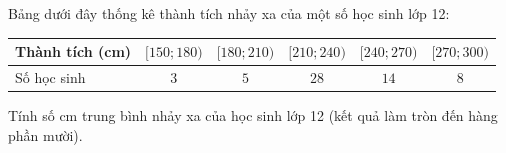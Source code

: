 \begin{ex}
Bảng dưới đây thống kê thành tích nhảy xa của một số học sinh lớp 12:
\begin{center}\begin{tabular}{|l|c|c|c|c|c|}\hline
Thành tích (cm) & $[150;180)$ & $[180;210)$ & $[210;240)$ & $[240;270)$ & $[270;300)$\\\hline
Số học sinh & $3$ & $5$ & $28$ & $14$ & $8$\\\hline
\end{tabular}\end{center}
Tính số cm trung bình nhảy xa của học sinh lớp 12 (kết quả làm tròn đến hàng phần mười).
\end{ex}
